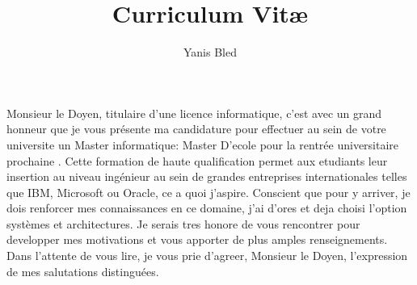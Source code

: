 \documentclass[10pt,stdletter]{newlfm}
\title{Curriculum Vit\ae}
\author{Yanis Bled}
\begin{document}
\begin{newlfm}
Monsieur le Doyen, titulaire d'une licence informatique, c'est avec un grand honneur que je vous présente ma candidature pour effectuer au sein de votre universite un Master informatique: Master D'ecole pour la rentrée universitaire prochaine . Cette formation de haute qualification permet aux etudiants leur insertion au niveau ingénieur au sein de grandes entreprises internationales telles que IBM, Microsoft ou Oracle, ce a quoi j'aspire. Conscient que pour y arriver, je dois renforcer mes connaissances en ce domaine, j'ai d'ores et deja choisi l'option systèmes et architectures. Je serais tres honore de vous rencontrer pour developper mes motivations et vous apporter de plus amples renseignements. Dans l'attente de vous lire, je vous prie d'agreer, Monsieur le Doyen, l'expression de mes salutations distinguées.
\end{newlfm}
\end{document}
